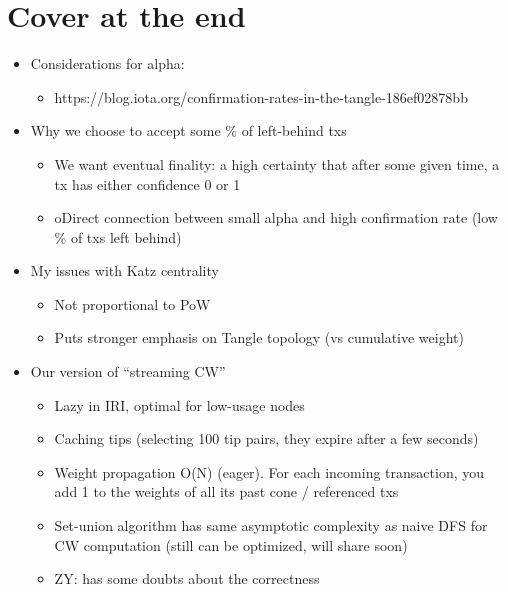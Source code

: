 \documentclass{article}
\begin{document}
\section{Cover at the end}
\begin{itemize}
	\item Considerations for alpha:
	\begin{itemize}
		\item https://blog.iota.org/confirmation-rates-in-the-tangle-186ef02878bb
	\end{itemize}
\end{itemize}
\begin{itemize}
	\item Why we choose to accept some \% of left-behind txs
	\begin{itemize}
		\item We want eventual finality: a high certainty that after some given time, a tx has either confidence 0 or 1
		\item oDirect connection between small alpha and high confirmation rate (low \% of txs left behind)
	\end{itemize}
\end{itemize}
\begin{itemize}
	\item My issues with Katz centrality
	\begin{itemize}
		\item Not proportional to PoW
		\item Puts stronger emphasis on Tangle topology (vs cumulative weight)
	\end{itemize}
\end{itemize}
\begin{itemize}
	\item Our version of “streaming CW”
	\begin{itemize}
		\item Lazy in IRI, optimal for low-usage nodes
		\item Caching tips (selecting 100 tip pairs, they expire after a few seconds)
		\item Weight propagation O(N) (eager). For each incoming transaction, you add 1 to the weights of all its past cone / referenced txs
		\item Set-union algorithm has same asymptotic complexity as naive DFS for CW computation (still can be optimized, will share soon)
		\item ZY: has some doubts about the correctness
	\end{itemize}
\end{itemize}
\end{document}
